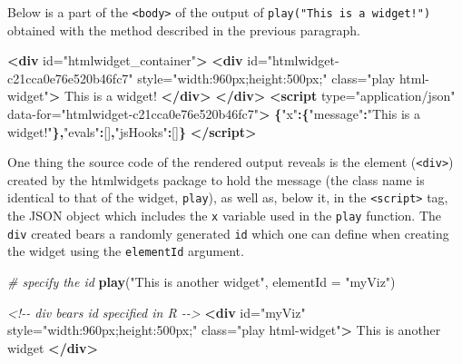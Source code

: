\documentclass[
]{krantz}
\makeatletter
\newenvironment{Shaded}{\begin{snugshade}}{\end{snugshade}}
\newcommand{\CommentTok}[1]{\textcolor[rgb]{0.37,0.37,0.37}{\textit{#1}}}
\newcommand{\DataTypeTok}[1]{\textcolor[rgb]{0.27,0.27,0.27}{#1}}
\newcommand{\KeywordTok}[1]{\textcolor[rgb]{0.27,0.27,0.27}{\textbf{#1}}}
\newcommand{\NormalTok}[1]{#1}
\newcommand{\OperatorTok}[1]{\textcolor[rgb]{0.43,0.43,0.43}{\textbf{#1}}}
\newcommand{\OtherTok}[1]{\textcolor[rgb]{0.37,0.37,0.37}{#1}}
\newcommand{\StringTok}[1]{\textcolor[rgb]{0.5,0.5,0.5}{#1}}
\newenvironment{kframe}{%
\medskip{}
\setlength{\fboxsep}{.8em}
 \def\at@end@of@kframe{}%
 \ifinner\ifhmode%
  \def\at@end@of@kframe{\end{minipage}}%
  \begin{minipage}{\columnwidth}%
 \fi\fi%
 \def\FrameCommand##1{\hskip\@totalleftmargin \hskip-\fboxsep
 \colorbox{shadecolor}{##1}\hskip-\fboxsep
     \hskip-\linewidth \hskip-\@totalleftmargin \hskip\columnwidth}%
 \MakeFramed {\advance\hsize-\width
   \@totalleftmargin\z@ \linewidth\hsize
   \@setminipage}}%
 {\par\unskip\endMakeFramed%
 \at@end@of@kframe}
\renewenvironment{Shaded}{\begin{kframe}}{\end{kframe}}
\makeatother
\begin{document}
Below is a part of the \texttt{\textless{}body\textgreater{}} of the output of \texttt{play("This\ is\ a\ widget!")} obtained with the method described in the previous paragraph.

\begin{Shaded}
\begin{Highlighting}[]
\KeywordTok{<div}\OtherTok{ id=}\StringTok{"htmlwidget\_container"}\KeywordTok{>}
  \KeywordTok{<div} 
\OtherTok{    id=}\StringTok{"htmlwidget{-}c21cca0e76e520b46fc7"} 
\OtherTok{    style=}\StringTok{"width:960px;height:500px;"} 
\OtherTok{    class=}\StringTok{"play html{-}widget"}\KeywordTok{>}
\NormalTok{    This is a widget!}
  \KeywordTok{</div>}
\KeywordTok{</div>}
\KeywordTok{<script} 
\OtherTok{  type=}\StringTok{"application/json"} 
\OtherTok{  data{-}for=}\StringTok{"htmlwidget{-}c21cca0e76e520b46fc7"}\KeywordTok{>}
  \OperatorTok{\{}\StringTok{"x"}\OperatorTok{:\{}\StringTok{"message"}\OperatorTok{:}\StringTok{"This is a widget!"}\OperatorTok{\},}\StringTok{"evals"}\OperatorTok{:}\NormalTok{[]}\OperatorTok{,}\StringTok{"jsHooks"}\OperatorTok{:}\NormalTok{[]}\OperatorTok{\}}
\KeywordTok{</script>}
\end{Highlighting}
\end{Shaded}

One thing the source code of the rendered output reveals is the element (\texttt{\textless{}div\textgreater{}}) created by the htmlwidgets package to hold the message (the class name is identical to that of the widget, \texttt{play}), as well as, below it, in the \texttt{\textless{}script\textgreater{}} tag, the JSON object which includes the \texttt{x} variable used in the \texttt{play} function. The \texttt{div} created bears a randomly generated \texttt{id} which one can define when creating the widget using the \texttt{elementId} argument.

\begin{Shaded}
\begin{Highlighting}[]
\CommentTok{\# specify the id}
\KeywordTok{play}\NormalTok{(}\StringTok{"This is another widget"}\NormalTok{, }\DataTypeTok{elementId =} \StringTok{"myViz"}\NormalTok{)}
\end{Highlighting}
\end{Shaded}

\begin{Shaded}
\begin{Highlighting}[]
\CommentTok{<!{-}{-} div bears id specified in R {-}{-}>}
\KeywordTok{<div}\OtherTok{ id=}\StringTok{"myViz"} 
\OtherTok{  style=}\StringTok{"width:960px;height:500px;"} 
\OtherTok{  class=}\StringTok{"play html{-}widget"}\KeywordTok{>}
\NormalTok{  This is another widget}
\KeywordTok{</div>}
\end{Highlighting}
\end{Shaded}
\end{document}
